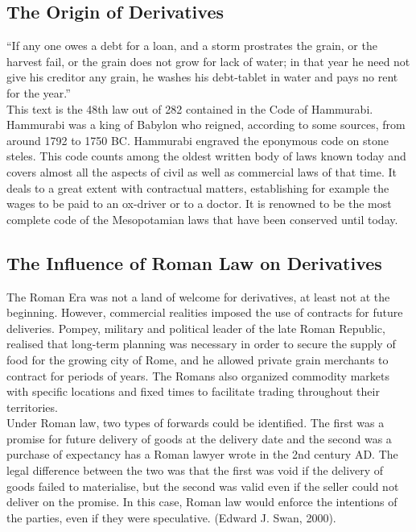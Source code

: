 \documentclass[a4 paper, 12pt]{report}
\theoremstyle{plain}
\begin{document}
\subsection{The Origin of Derivatives}
\noindent
\par ``If any one owes a debt for a loan, and a storm prostrates the grain, or the harvest
fail, or the grain does not grow for lack of water; in that year he need not give his creditor
any grain, he washes his debt-tablet in water and pays no rent for the year.''\\
This text is the 48th law out of 282 contained in the Code of Hammurabi. Hammurabi was
a king of Babylon who reigned, according to some sources, from around 1792 to 1750 BC.
Hammurabi engraved the eponymous code on stone steles. This code counts among the
oldest written body of laws known today and covers almost all the aspects of civil as well
as commercial laws of that time. It deals to a great extent with contractual matters,
establishing for example the wages to be paid to an ox-driver or to a doctor. It is
renowned to be the most complete code of the Mesopotamian laws that have been
conserved until today.

\subsection{The Influence of Roman Law on Derivatives}
\noindent
\par The Roman Era was not a land of welcome for derivatives, at least not at the
beginning. However, commercial realities imposed the use of contracts for future
deliveries. Pompey, military and political leader of the late Roman Republic, realised that
long-term planning was necessary in order to secure the supply of food for the growing
city of Rome, and he allowed private grain merchants to contract for periods of years.
The Romans also organized commodity markets with specific locations and fixed times to
facilitate trading throughout their territories.\\
Under Roman law, two types of forwards could be identified. The first was a promise for
future delivery of goods at the delivery date and the second was a purchase of
expectancy has a Roman lawyer wrote in the 2nd century AD. The legal difference
between the two was that the first was void if the delivery of goods failed to materialise,
but the second was valid even if the seller could not deliver on the promise. In this case,
Roman law would enforce the intentions of the parties, even if they were speculative. (Edward J. Swan, 2000).
\end{document}

